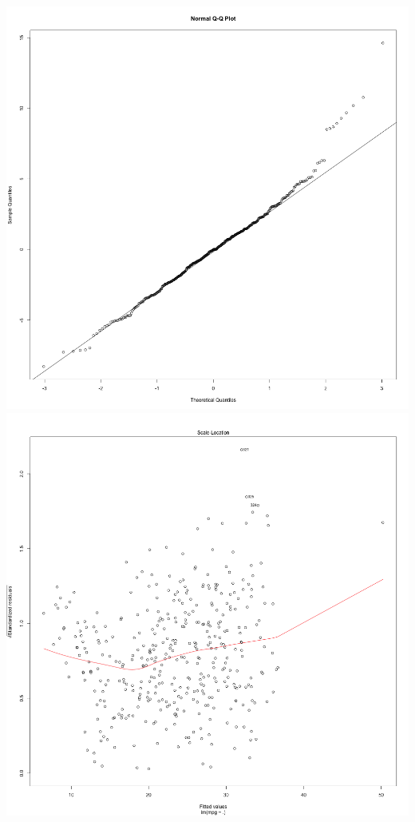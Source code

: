 \documentclass[11pt]{article} %
\begin{document}
\begin{center}
\includegraphics[scale=0.13]{1_QQplot}
\includegraphics[scale=0.13]{1_Variance}
\end{center}
\end{document}
